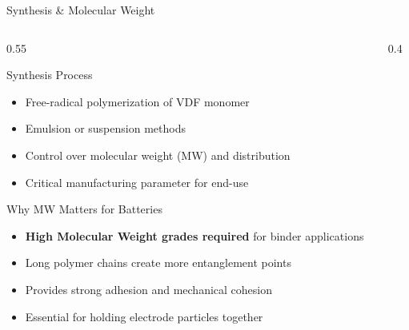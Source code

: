 \documentclass[aspectratio=169]{beamer}
\begin{document}
\begin{frame}{Synthesis \& Molecular Weight}
    \begin{columns}[T]
        \begin{column}{0.55\textwidth}
            \begin{block}{Synthesis Process}
                \begin{itemize}
                    \item Free-radical polymerization of VDF monomer
                    \item Emulsion or suspension methods
                    \item Control over molecular weight (MW) and distribution
                    \item Critical manufacturing parameter for end-use
                \end{itemize}
            \end{block}
            
            \begin{alertblock}{Why MW Matters for Batteries}
                \begin{itemize}
                    \item \textbf{High Molecular Weight grades required} for binder applications
                    \item Long polymer chains create more entanglement points
                    \item Provides strong adhesion and mechanical cohesion
                    \item Essential for holding electrode particles together
                \end{itemize}
            \end{alertblock}
        \end{column}
        
        \begin{column}{0.4\textwidth}
            \begin{center}
            \end{center}
        \end{column}
    \end{columns}
\end{frame}
\end{document}
